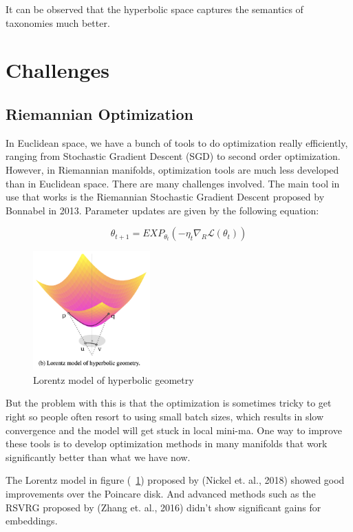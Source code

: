 It can be observed that the hyperbolic space captures the semantics of taxonomies much better.


\section{Challenges}

\subsection{Riemannian Optimization}

In Euclidean space, we have a bunch of tools to do optimization really efficiently, ranging from Stochastic Gradient Descent (SGD) to second order optimization. However, in Riemannian manifolds, optimization tools are much less developed than in Euclidean space. There are many challenges involved. The main tool in use that works is the Riemannian Stochastic Gradient Descent proposed by Bonnabel in 2013. Parameter updates are given by the following equation:

\begin{equation} \label{eq:RSGD}
    \theta_{t+1} = EXP_{\theta_t} (−\eta_t \nabla_R \mathcal{L}(\theta_t))
\end{equation}

\begin{figure}[htb]
  \centering
    \includegraphics[width=0.4\textwidth]{figs/1-Lorentz.png}
    \caption{Lorentz model of hyperbolic geometry}
    \label{fig:1-Lorentz}
\end{figure}

But the problem with this is that the optimization is sometimes tricky to get right so people often resort to using small batch sizes, which results in slow convergence and the model will get stuck in local mini-ma. One way to improve these tools is to develop optimization methods in many manifolds that work significantly better than what we have now.

The Lorentz model in figure (~\ref{fig:1-Lorentz}) proposed by (Nickel et. al., 2018) showed good improvements over the Poincare disk. And advanced methods such as the RSVRG proposed by (Zhang et. al., 2016) didn't show significant gains for embeddings.  

